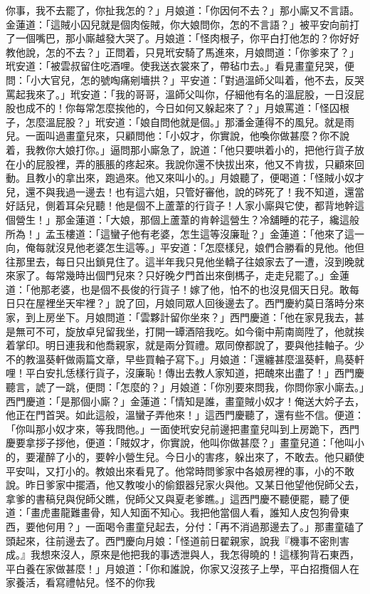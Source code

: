\begin{showcontents}{}
你事，我不去罷了，你扯我怎的？」月娘道：「你因何不去？」那小廝又不言語。金蓮道：「這賊小囚兒就是個肉侫賊，你大娘問你，怎的不言語？」被平安向前打了一個嘴巴，那小廝越發大哭了。月娘道：「怪肉根子，你平白打他怎的？你好好教他說，怎的不去？」正問着，只見玳安騎了馬進來，月娘問道：「你爹來了？」玳安道：「被雲叔留住吃酒哩。使我送衣裳來了，帶毡巾去。」看見畫童兒哭，便問：「小大官兒，怎的號啕痛剜墻拱？」平安道：「對過溫師父叫着，他不去，反哭罵起我來了。」玳安道：「我的哥哥，溫師父叫你，仔細他有名的溫屁股，一日沒屁股也成不的！你每常怎麼挨他的，今日如何又躲起來了？」月娘罵道：「怪囚根子，怎麼溫屁股？」玳安道：「娘自問他就是個。」那潘金蓮得不的風兒。就是雨兒。一面叫過畫童兒來，只顧問他：「小奴才，你實說，他喚你做甚麼？你不說着，我教你大娘打你。」逼問那小廝急了，說道：「他只要哄着小的，把他行貨子放在小的屁股裡，弄的脹脹的疼起來。我說你還不快拔出來，他又不肯拔，只顧來回動。且教小的拿出來，跑過來。他又來叫小的。」月娘聽了，便喝道：「怪賊小奴才兒，還不與我過一邊去！也有這六姐，只管好審他，說的硶死了！我不知道，還當好話兒，側着耳朵兒聽！他是個不上蘆葦的行貨子！人家小廝與它使，都背地幹這個營生！」那金蓮道：「大娘，那個上蘆葦的肯幹這營生？冷舖睡的花子，纔這般所為！」孟玉樓道：「這蠻子他有老婆，怎生這等沒廉耻？」金蓮道：「他來了這一向，俺每就沒見他老婆怎生這等。」平安道：「怎麼樣兒，娘們合勝看的見他。他但往那里去，每日只出鎖見住了。這半年我只見他坐轎子往娘家去了一遭，沒到晚就來家了。每常幾時出個門兒來？只好晚夕門首出來倒榪子，走走兒罷了。」金蓮道：「他那老婆，也是個不長俊的行貨子！嫁了他，怕不的也沒見個天日兒。敢每日只在屋裡坐天牢裡？」說了回，月娘同眾人回後邊去了。西門慶約莫日落時分來家，到上房坐下。月娘問道：「雲夥計留你坐來？」西門慶道：「他在家見我去，甚是無可不可，旋放卓兒留我坐，打開一罈酒陪我吃。如今衞中荊南崗陞了，他就挨着掌印。明日連我和他喬親家，就是兩分賀禮。眾同僚都說了，要與他挂軸子。少不的教溫葵軒做兩篇文章，早些買軸子寫下。」月娘道：「還纏甚麼溫葵軒，鳥葵軒哩！平白安扎恁樣行貨子，沒廉恥！傳出去教人家知道，把醜來出盡了！」西門慶聽言，諕了一跳，便問：「怎麼的？」月娘道：「你別要來問我，你問你家小廝去。」西門慶道：「是那個小廝？」金蓮道：「情知是誰，畫童賊小奴才！俺送大妗子去，他正在門首哭。如此這般，溫蠻子弄他來！」這西門慶聽了，還有些不信。便道：「你叫那小奴才來，等我問他。」一面使玳安兒前邊把畫童兒叫到上房跪下，西門慶要拿拶子拶他，便道：「賊奴才，你實說，他叫你做甚麼？」畫童兒道：「他叫小的，要灌醉了小的，要幹小營生兒。今日小的害疼，躲出來了，不敢去。他只顧使平安叫，又打小的。教娘出來看見了。他常時問爹家中各娘房裡的事，小的不敢說。昨日爹家中擺酒，他又教唆小的偷銀器兒家火與他。又某日他望他倪師父去，拿爹的書稿兒與倪師父瞧，倪師父又與夏老爹瞧。」這西門慶不聽便罷，聽了便道：「畫虎畫龍難畫骨，知人知面不知心。我把他當個人看，誰知人皮包狗骨東西，要他何用？」一面喝令畫童兒起去，分付：「再不消過那邊去了。」那畫童磕了頭起來，往前邊去了。西門慶向月娘：「怪道前日翟親家，說我『機事不密則害成。』我想來沒人，原來是他把我的事透泄與人，我怎得曉的！這樣狗背石東西，平白養在家做甚麼！」月娘道：「你和誰說，你家又沒孩子上學，平白招攬個人在家養活，看寫禮帖兒。怪不的你我
\end{showcontents}
